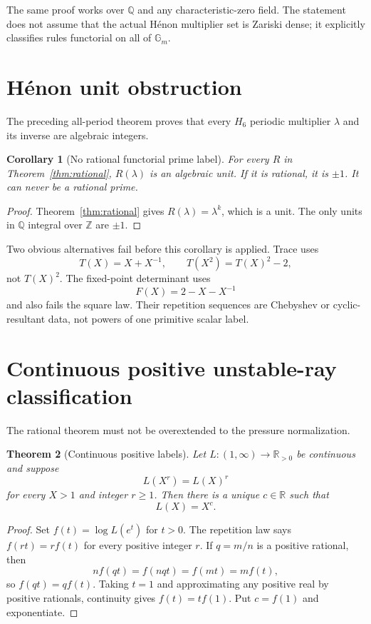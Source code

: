 \documentclass[11pt]{article}
\newtheorem{theorem}{Theorem}[section]
\newtheorem{corollary}[theorem]{Corollary}
\theoremstyle{remark}\newtheorem{remark}[theorem]{Remark}
\begin{document}
The same proof works over $\mathbb Q$ and any characteristic-zero field.
The statement does not assume that the actual H\'enon multiplier set is
Zariski dense; it explicitly classifies rules functorial on all of
$\mathbb G_m$.

\section{H\'enon unit obstruction}
The preceding all-period theorem proves that every $H_6$ periodic multiplier
$\lambda$ and its inverse are algebraic integers.

\begin{corollary}[No rational functorial prime label]\label{cor:noprime}
For every $R$ in Theorem~\ref{thm:rational}, $R(\lambda)$ is an algebraic
unit.  If it is rational, it is $\pm1$.  It can never be a rational prime.
\end{corollary}
\begin{proof}
Theorem~\ref{thm:rational} gives $R(\lambda)=\lambda^k$, which is a unit.
The only units in $\mathbb Q$ integral over $\mathbb Z$ are $\pm1$.
\end{proof}

Two obvious alternatives fail before this corollary is applied.  Trace uses
\[
T(X)=X+X^{-1},
\qquad T(X^2)=T(X)^2-2,
\]
not $T(X)^2$.  The fixed-point determinant uses
\[
F(X)=2-X-X^{-1}
\]
and also fails the square law.  Their repetition sequences are Chebyshev or
cyclic-resultant data, not powers of one primitive scalar label.

\section{Continuous positive unstable-ray classification}
The rational theorem must not be overextended to the pressure normalization.

\begin{theorem}[Continuous positive labels]\label{thm:continuous}
Let $L:(1,\infty)\to\mathbb R_{>0}$ be continuous and suppose
\[
L(X^r)=L(X)^r
\]
for every $X>1$ and integer $r\geq1$.  Then there is a unique
$c\in\mathbb R$ such that
\[
L(X)=X^c.
\]
\end{theorem}
\begin{proof}
Set $f(t)=\log L(e^t)$ for $t>0$.  The repetition law says
$f(rt)=rf(t)$ for every positive integer $r$.  If $q=m/n$ is a positive
rational, then
\[
n f(qt)=f(nqt)=f(mt)=m f(t),
\]
so $f(qt)=qf(t)$.  Taking $t=1$ and approximating any positive real by
positive rationals, continuity gives $f(t)=t f(1)$.  Put $c=f(1)$ and
exponentiate.
\end{proof}
\end{document}
